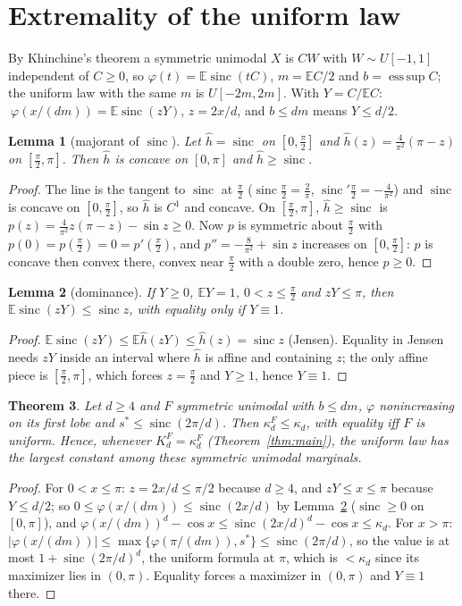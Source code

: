 \documentclass[11pt]{amsart}
\newtheorem{theorem}{Theorem}[section]\newtheorem{proposition}[theorem]{Proposition}\newtheorem{lemma}[theorem]{Lemma}
\theoremstyle{definition}\newtheorem{definition}[theorem]{Definition}\theoremstyle{remark}\newtheorem{remark}[theorem]{Remark}
\newcommand{\sinc}{\operatorname{sinc}}\newcommand{\E}{\mathbb E}\newcommand{\cx}{\le_{\mathrm{cx}}}
\begin{document}
\section{Extremality of the uniform law}\label{sec:ext}
By Khinchine's theorem a symmetric unimodal $X$ is $CW$ with $W\sim U[-1,1]$ independent of $C\ge0$, so $\varphi(t)=\E\sinc(tC)$, $m=\E C/2$ and $b=\operatorname{ess\,sup}C$; the
uniform law with the same $m$ is $U[-2m,2m]$. With $Y=C/\E C$: $\ \varphi(x/(dm))=\E\sinc(zY)$, $z=2x/d$, and $b\le dm$ means $Y\le d/2$.
\begin{lemma}[majorant of $\sinc$]\label{lem:maj}
Let $\hat h=\sinc$ on $[0,\frac\pi2]$ and $\hat h(z)=\frac4{\pi^2}(\pi-z)$ on $[\frac\pi2,\pi]$. Then $\hat h$ is concave on $[0,\pi]$ and $\hat h\ge\sinc$.
\end{lemma}
\begin{proof}The line is the tangent to $\sinc$ at $\frac\pi2$ ($\sinc\frac\pi2=\frac2\pi$, $\sinc'\frac\pi2=-\frac4{\pi^2}$) and $\sinc$ is concave on $[0,\frac\pi2]$, so $\hat h$ is $C^1$ and
concave. On $[\frac\pi2,\pi]$, $\hat h\ge\sinc$ is $p(z)=\frac4{\pi^2}z(\pi-z)-\sin z\ge0$. Now $p$ is symmetric about $\frac\pi2$ with $p(0)=p(\frac\pi2)=0=p'(\frac\pi2)$, and
$p''=-\frac8{\pi^2}+\sin z$ increases on $[0,\frac\pi2]$: $p$ is concave then convex there, convex near $\frac\pi2$ with a double zero, hence $p\ge0$.\end{proof}
\begin{lemma}[dominance]\label{lem:dom}
If $Y\ge0$, $\E Y=1$, $0<z\le\frac\pi2$ and $zY\le\pi$, then $\E\sinc(zY)\le\sinc z$, with equality only if $Y\equiv1$.
\end{lemma}
\begin{proof}$\E\sinc(zY)\le\E\hat h(zY)\le\hat h(z)=\sinc z$ (Jensen). Equality in Jensen needs $zY$ inside an interval where $\hat h$ is affine and containing $z$; the only
affine piece is $[\frac\pi2,\pi]$, which forces $z=\frac\pi2$ and $Y\ge1$, hence $Y\equiv1$.\end{proof}
\begin{theorem}\label{thm:ext}
Let $d\ge4$ and $F$ symmetric unimodal with $b\le dm$, $\varphi$ nonincreasing on its first lobe and $s^*\le\sinc(2\pi/d)$. Then $\kappa_d^F\le\kappa_d$, with equality
iff $F$ is uniform. Hence, whenever $K_d^F=\kappa_d^F$ (Theorem~\ref{thm:main}), the uniform law has the largest constant among these symmetric unimodal marginals.
\end{theorem}
\begin{proof}For $0<x\le\pi$: $z=2x/d\le\pi/2$ because $d\ge4$, and $zY\le x\le\pi$ because $Y\le d/2$; so $0\le\varphi(x/(dm))\le\sinc(2x/d)$ by Lemma~\ref{lem:dom} ($\sinc\ge0$ on $[0,\pi]$),
and $\varphi(x/(dm))^d-\cos x\le\sinc(2x/d)^d-\cos x\le\kappa_d$. For $x>\pi$: $|\varphi(x/(dm))|\le\max\{\varphi(\pi/(dm)),s^*\}\le\sinc(2\pi/d)$, so the value is at most
$1+\sinc(2\pi/d)^d$, the uniform formula at $\pi$, which is $<\kappa_d$ since its maximizer lies in $(0,\pi)$. Equality forces a maximizer in $(0,\pi)$ and
$Y\equiv1$ there.\end{proof}
\end{document}
